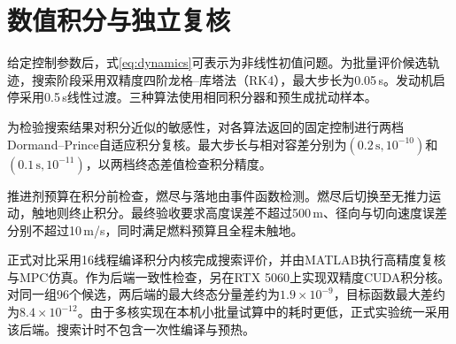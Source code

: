 \section{数值积分与独立复核}
给定控制参数后，式\eqref{eq:dynamics}可表示为非线性初值问题。为批量评价候选轨迹，搜索阶段采用双精度四阶龙格--库塔法（RK4），最大步长为0.05\,s。发动机启停采用0.5\,s线性过渡。三种算法使用相同积分器和预生成扰动样本。

为检验搜索结果对积分近似的敏感性，对各算法返回的固定控制进行两档Dormand--Prince自适应积分复核\cite{dormand1980,shampine1997}。最大步长与相对容差分别为$(0.2\,\mathrm s,10^{-10})$和$(0.1\,\mathrm s,10^{-11})$，以两档终态差值检查积分精度。

推进剂预算在积分前检查，燃尽与落地由事件函数检测。燃尽后切换至无推力运动，触地则终止积分。最终验收要求高度误差不超过500\,m、径向与切向速度误差分别不超过10\,m/s，同时满足燃料预算且全程未触地。

正式对比采用16线程编译积分内核完成搜索评价，并由MATLAB执行高精度复核与MPC仿真。作为后端一致性检查，另在RTX 5060上实现双精度CUDA积分核。对同一组96个候选，两后端的最大终态分量差约为$1.9\times10^{-9}$，目标函数最大差约为$8.4\times10^{-12}$。由于多核实现在本机小批量试算中的耗时更低，正式实验统一采用该后端。搜索计时不包含一次性编译与预热。
